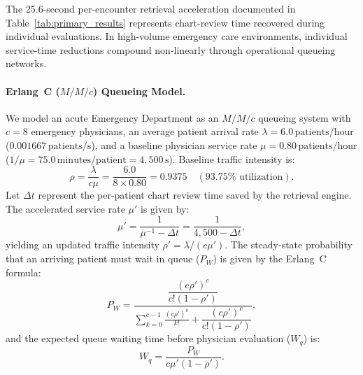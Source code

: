 \documentclass[10pt, onecolumn]{article}
\begin{document}
The 25.6-second per-encounter retrieval acceleration documented in Table~\ref{tab:primary_results} represents chart-review time recovered during individual evaluations. In high-volume emergency care environments, individual service-time reductions compound non-linearly through operational queueing networks.

\paragraph{Erlang~C ($M/M/c$) Queueing Model.}
We model an acute Emergency Department as an $M/M/c$ queueing system with $c = 8$ emergency physicians, an average patient arrival rate $\lambda = 6.0\,\text{patients/hour}$ ($0.001667\,\text{patients/s}$), and a baseline physician service rate $\mu = 0.80\,\text{patients/hour}$ ($1/\mu = 75.0\,\text{minutes/patient} = 4{,}500\,\text{s}$). Baseline traffic intensity is:
\begin{equation}
  \rho = \frac{\lambda}{c \mu} = \frac{6.0}{8 \times 0.80} = 0.9375 \quad (93.75\% \text{ utilization}).
\end{equation}
Let $\Delta t$ represent the per-patient chart review time saved by the retrieval engine. The accelerated service rate $\mu'$ is given by:
\begin{equation}
  \mu' = \frac{1}{\mu^{-1} - \Delta t} = \frac{1}{4{,}500 - \Delta t},
  \label{eq:mu_prime}
\end{equation}
yielding an updated traffic intensity $\rho' = \lambda / (c \mu')$. The steady-state probability that an arriving patient must wait in queue ($P_W$) is given by the Erlang~C formula:
\begin{equation}
  P_W = \frac{\dfrac{(c \rho')^c}{c!(1-\rho')}}{\displaystyle\sum_{k=0}^{c-1} \frac{(c \rho')^k}{k!} + \dfrac{(c \rho')^c}{c!(1-\rho')}},
  \label{eq:erlang_c_pw}
\end{equation}
and the expected queue waiting time before physician evaluation ($W_q$) is:
\begin{equation}
  W_q = \frac{P_W}{c \mu' (1 - \rho')}.
  \label{eq:wq_formula}
\end{equation}
\end{document}
